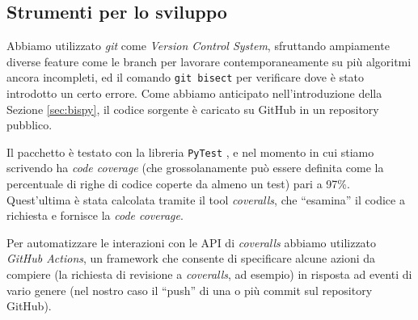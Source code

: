 \subsection{Strumenti per lo sviluppo}
Abbiamo utilizzato \emph{git} come \emph{Version Control System}, sfruttando ampiamente diverse feature come le branch per lavorare contemporaneamente su più algoritmi ancora incompleti, ed il comando \verb|git bisect| per verificare dove è stato introdotto un certo errore. Come abbiamo anticipato nell'introduzione della Sezione \ref{sec:bispy}, il codice sorgente è caricato su GitHub in un repository pubblico.

Il pacchetto è testato con la libreria \texttt{PyTest} \cite{pytest}, e nel momento in cui stiamo scrivendo ha \emph{code coverage} (che grossolanamente può essere definita come la percentuale di righe di codice coperte da almeno un test) pari a 97\%. Quest'ultima è stata calcolata tramite il tool \emph{coveralls}, che ``esamina'' il codice a richiesta e fornisce la \emph{code coverage}.

Per automatizzare le interazioni con le API di \emph{coveralls} abbiamo utilizzato \emph{GitHub Actions}, un framework che consente di specificare alcune azioni da compiere (la richiesta di revisione a \emph{coveralls}, ad esempio) in risposta ad eventi di vario genere (nel nostro caso il ``push'' di una o più commit sul repository GitHub).
